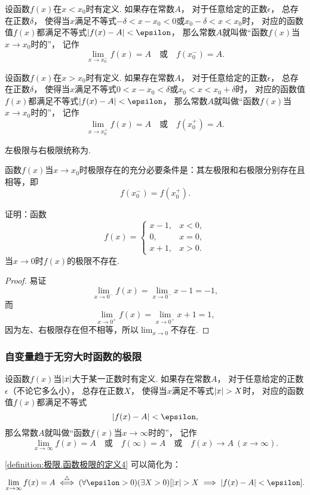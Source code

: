 \begin{definition}\label{definition:极限.函数极限的定义2}
设函数\(f(x)\)在\(x < x_0\)时有定义.
如果存在常数\(A\)，
对于任意给定的正数\(\epsilon\)，
总存在正数\(\delta\)，
使得当\(x\)满足不等式\(-\delta < x - x_0 < 0\)或\(x_0 - \delta < x < x_0\)时，
对应的函数值\(f(x)\)都满足不等式\(\abs{f(x) - A} < \epsilon\)，
那么常数\(A\)就叫做“函数\(f(x)\)当\(x \to x_0\)时的”，
记作\[
\lim_{x \to x_0^-} f(x) = A
\quad\text{或}\quad
f(x_0^-) = A.
\]
\end{definition}

\begin{definition}\label{definition:极限.函数极限的定义3}
设函数\(f(x)\)在\(x > x_0\)时有定义.
如果存在常数\(A\)，
对于任意给定的正数\(\epsilon\)，
总存在正数\(\delta\)，
使得当\(x\)满足不等式\(0 < x - x_0 < \delta\)或\(x_0 < x < x_0 + \delta\)时，
对应的函数值\(f(x)\)都满足不等式\(\abs{f(x) - A} < \epsilon\)，
那么常数\(A\)就叫做“函数\(f(x)\)当\(x \to x_0\)时的”，
记作\[
\lim_{x \to x_0^+} f(x) = A
\quad\text{或}\quad
f(x_0^+) = A.
\]
\end{definition}
左极限与右极限统称为.

\begin{theorem}
函数\(f(x)\)当\(x \to x_0\)时极限存在的充分必要条件是：其左极限和右极限分别存在且相等，即\[
f(x_0^-) = f(x_0^+).
\]
\end{theorem}

\begin{example}
证明：函数\[
f(x) = \left\{ \begin{array}{lc}
x-1, & x<0, \\
0, & x=0, \\
x+1, & x>0.
\end{array} \right.
\]当\(x\to0\)时\(f(x)\)的极限不存在.
\begin{proof}
易证\[
\lim_{x\to0^-} f(x) = \lim_{x\to0^-} x-1 = -1,
\]而\[
\lim_{x\to0^+} f(x) = \lim_{x\to0^+} x+1 = 1,
\]因为左、右极限存在但不相等，所以\(\lim_{x\to0}\)不存在.
\end{proof}
\end{example}

\subsubsection*{自变量趋于无穷大时函数的极限}
\begin{definition}\label{definition:极限.函数极限的定义4}
设函数\(f(x)\)当\(\abs{x}\)大于某一正数时有定义.
如果存在常数\(A\)，
对于任意给定的正数\(\epsilon\)（不论它多么小），
总存在正数\(X\)，
使得当\(x\)满足不等式\(\abs{x} > X\)时，
对应的函数值\(f(x)\)都满足不等式\[
\abs{f(x) - A} < \epsilon,
\]那么常数\(A\)就叫做“函数\(f(x)\)当\(x \to \infty\)时的”，
记作\[
\lim_{x \to \infty} f(x) = A
\quad\text{或}\quad
f(\infty) = A
\quad\text{或}\quad
f(x) \to A\ (x \to \infty).
\]
\end{definition}
\cref{definition:极限.函数极限的定义4} 可以简化为：
\[
	\lim_{x\to\infty} f(x) = A
	\defiff
	(\forall\epsilon>0)
	(\exists X>0)
	[
		\abs{x} > X
		\implies
		\abs{f(x) - A} < \epsilon
	].
\]

